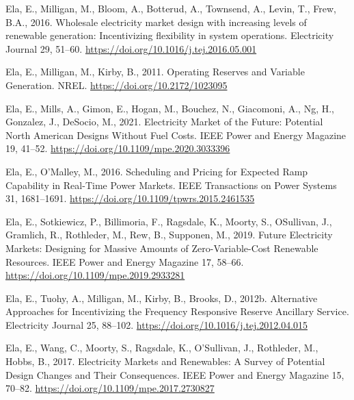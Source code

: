 \documentclass[12pt,a4paper,]{report}
\newlength{\cslhangindent}
\newenvironment{CSLReferences}[2] %
 {%
  \setlength{\parindent}{0pt}
  \ifodd #1 \everypar{\setlength{\hangindent}{\cslhangindent}}\ignorespaces\fi
  \ifnum #2 > 0
  \setlength{\parskip}{#2\baselineskip}
  \fi
 }%
 {}
\begin{document}
\begin{CSLReferences}{1}{0}
\leavevmode{}%
Ela, E., Milligan, M., Bloom, A., Botterud, A., Townsend, A., Levin, T.,
Frew, B.A., 2016. Wholesale electricity market design with increasing
levels of renewable generation: {Incentivizing} flexibility in system
operations. Electricity Journal 29, 51--60.
\url{https://doi.org/10.1016/j.tej.2016.05.001}

\leavevmode{}%
Ela, E., Milligan, M., Kirby, B., 2011. Operating {Reserves} and
{Variable Generation}. {NREL}. \url{https://doi.org/10.2172/1023095}

\leavevmode{}%
Ela, E., Mills, A., Gimon, E., Hogan, M., Bouchez, N., Giacomoni, A.,
Ng, H., Gonzalez, J., DeSocio, M., 2021. Electricity {Market} of the
{Future}: {Potential North American Designs Without Fuel Costs}. IEEE
Power and Energy Magazine 19, 41--52.
\url{https://doi.org/10.1109/mpe.2020.3033396}

\leavevmode{}%
Ela, E., O'Malley, M., 2016. Scheduling and {Pricing} for {Expected Ramp
Capability} in {Real-Time Power Markets}. IEEE Transactions on Power
Systems 31, 1681--1691. \url{https://doi.org/10.1109/tpwrs.2015.2461535}

\leavevmode{}%
Ela, E., Sotkiewicz, P., Billimoria, F., Ragsdale, K., Moorty, S.,
OSullivan, J., Gramlich, R., Rothleder, M., Rew, B., Supponen, M., 2019.
Future {Electricity Markets}: {Designing} for {Massive Amounts} of
{Zero-Variable-Cost Renewable Resources}. IEEE Power and Energy Magazine
17, 58--66. \url{https://doi.org/10.1109/mpe.2019.2933281}

\leavevmode{}%
Ela, E., Tuohy, A., Milligan, M., Kirby, B., Brooks, D., 2012b.
Alternative {Approaches} for {Incentivizing} the {Frequency Responsive
Reserve Ancillary Service}. Electricity Journal 25, 88--102.
\url{https://doi.org/10.1016/j.tej.2012.04.015}

\leavevmode{}%
Ela, E., Wang, C., Moorty, S., Ragsdale, K., O'Sullivan, J., Rothleder,
M., Hobbs, B., 2017. Electricity {Markets} and {Renewables}: {A Survey}
of {Potential Design Changes} and {Their Consequences}. IEEE Power and
Energy Magazine 15, 70--82.
\url{https://doi.org/10.1109/mpe.2017.2730827}


\end{CSLReferences}
\end{document}
